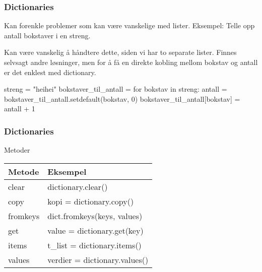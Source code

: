\begin{frame}[fragile]
    \frametitle{Dictionaries}

    Kan forenkle problemer som kan være vanskelige med lister. Eksempel: Telle opp antall bokstaver i en streng. 

    Kan være vanskelig å håndtere dette, siden vi har to separate lister. Finnes selvsagt andre løsninger, men for å få en direkte kobling mellom bokstav og antall er det enklest med dictionary. 

\begin{python}
streng = "heihei"
bokstaver_til_antall = {}
for bokstav in streng: 
    antall = bokstaver_til_antall.setdefault(bokstav, 0)
    bokstaver_til_antall[bokstav] = antall + 1
\end{python}

\end{frame}

\begin{frame}
    \frametitle{Dictionaries}

    Metoder

    \begin{table}[]
        \begin{tabular}{|l|l|}
        \hline
        Metode   & Eksempel                      \\ \hline
        clear    & dictionary.clear()            \\ \hline
        copy     & kopi = dictionary.copy()      \\ \hline
        fromkeys & dict.fromkeys(keys, values)   \\ \hline
        get      & value = dictionary.get(key)   \\ \hline
        items    & t\_list = dictionary.items()  \\ \hline
        values   & verdier = dictionary.values() \\ \hline
        \end{tabular}
    \end{table}

\end{frame}


